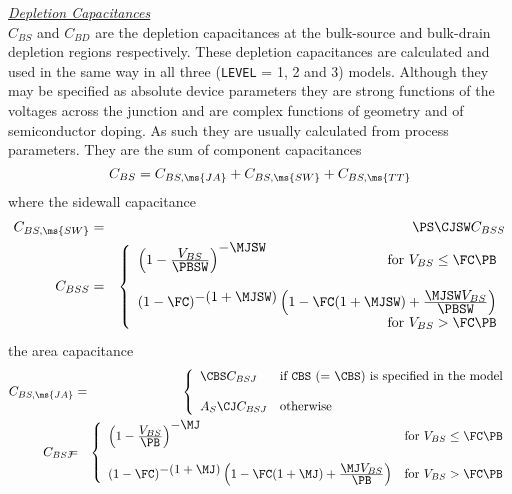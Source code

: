 \noindent\underline{\sl \large Depletion Capacitances}\\[0.1in]
  $C_{BS}$ and $C_{BD}$ are the depletion capacitances
at the bulk-source and bulk-drain depletion regions respectively.
These depletion capacitances are calculated and used in the same
way in all three ({\tt LEVEL} = 1, 2 and 3) models. Although they
may be specified as absolute device parameters they are strong
functions of the voltages across the junction and are complex
functions of geometry and of semiconductor doping. As such they
are usually calculated from process parameters. They are the sum
of component capacitances 
\begin{equation}
C_{BS} = C_{BS,\ms{JA}} + C_{BS,\ms{SW}} + C_{BS,\ms{TT}}
\end{equation}
where the sidewall capacitance
\begin{eqnarray}
C_{BS,\ms{SW}} &=& \PS\CJSW C_{BSS} \\
C_{BSS} &=& \left\{ \begin{array}{l}
       \left( 1 - {{\textstyle V_{BS}}
       \over {\textstyle\PBSW}} \right)^{\textstyle -\MJSW} \hfill
       \mbox{for $V_{BS}  \le \FC\PB$} \\ \\
       (1 - \FC )^{\textstyle -(1+\MJSW )}
       \left(1 - \FC (1+\MJSW )
       + {{\textstyle \MJSW V_{BS}}
       \over { \textstyle \PBSW}} \right)
       \\ \hspace*{\fill} \mbox{for $V_{BS}  > \FC\PB$}
       \end{array} \right. \\ %
\end{eqnarray}
the area capacitance
\begin{eqnarray}
C_{BS,\ms{JA}} &=&
  \left\{ \begin{array}{ll}
  \CBS C_{BSJ} &  \mbox{if {\tt CBS} (= $\CBS$)
                    is specified in the model} \\ \\
  A_S\CJ C_{BSJ} & \mbox{otherwise} \end{array} \right. \\ %
C_{BSJ} &\hspace{-0.1in}=&\hspace{-0.1in} \left\{
\begin{array}{ll}
       \left(1 - {\textstyle {V_{BS}} \over
       {\textstyle \PB}} \right)^{\textstyle -\MJ}
       & \mbox{for $V_{BS}  \le \FC\PB$} \\ \\
       (1 -\FC)^{\textstyle -(1+\MJ)}
       \left(1 - \FC (1+\MJ)
       + {{\textstyle\MJ V_{BS}}
       \over {\textstyle \PB}} \right)
       & \mbox{for $V_{BS}  > \FC\PB$}
       \end{array} \right. %
\end{eqnarray}
